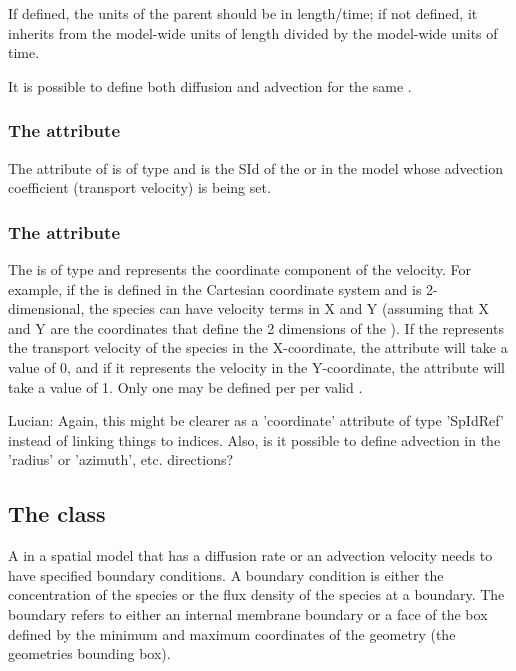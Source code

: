 If defined, the units of the parent \Parameter should be in length/time; if not defined, it inherits from the model-wide units of length divided by the model-wide units of time.

It is possible to define both diffusion and advection for the same \Species.

\subsubsection{The  attribute}
The  attribute of \AdvectionCoefficient is of type  and is the SId of the \Species or \Parameter in the model whose advection coefficient (transport velocity) is being set.

\subsubsection{The  attribute}
The  is of type  and represents the coordinate component of the velocity. For example, if the \Geometry is defined in the Cartesian coordinate system and is 2-dimensional, the species can have velocity terms in X and Y (assuming that X and Y are the coordinates that define the 2 dimensions of the \Geometry). If the \Parameter represents the transport velocity of the species in the X-coordinate, the  attribute will take a value of 0, and if it represents the velocity in the Y-coordinate, the attribute will take a value of 1.  Only one \AdvectionCoefficient may be defined per \Species per valid .

{\color{red} Lucian: \notice Again, this might be clearer as a 'coordinate' attribute of type 'SpIdRef' instead of linking things to indices.  Also, is it possible to define advection in the 'radius' or 'azimuth', etc. directions?}


\subsection{The  class}
\label{BoundaryCondition-class}
A \Species in a spatial model that has a diffusion rate or an advection velocity needs to have specified boundary conditions. A boundary condition is either the concentration of the species or the flux density of the species at a boundary.  The boundary refers to either an internal membrane boundary or a face of the box defined by the minimum and maximum coordinates of the geometry (the geometries bounding box).  

